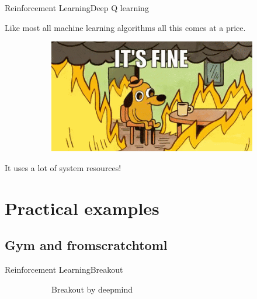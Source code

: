 \documentclass[10pt]{beamer}
\begin{document}
\begin{frame}{Reinforcement Learning}{Deep Q learning}
\item Like most all machine learning algorithms all this comes at a price.


\pause
\begin{figure}[!htb]
\centering
\begin{subfigure}[t]{0.5\linewidth}
\includegraphics[width=1.5\textwidth]{assets/meme_itsfine.png}
\end{subfigure}
\vspace{0.1in}
\label{fig:tripEmb}
\end{figure}
It uses a lot of system resources!

\end{frame}

\section{Practical examples}
\subsection{Gym and fromscratchtoml}
\begin{frame}{Reinforcement Learning}{Breakout}

\begin{figure}[!htb]
\centering
\begin{subfigure}[t]{0.5\linewidth}

\item \alert{Breakout by deepmind} \href{https://www.youtube.com/watch?v=TmPfTpjtdgg }{}

\end{subfigure}
\vspace{0.1in}
\label{fig:tripEmb}
\end{figure}

\end{frame}
\end{document}

